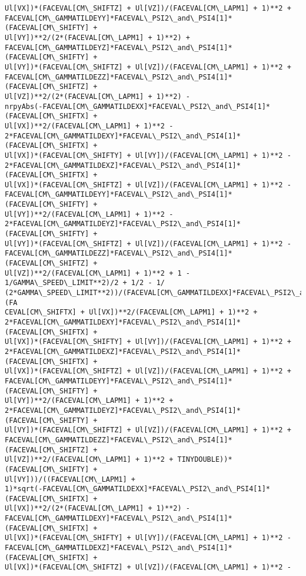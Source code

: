 \documentclass[landscape,letterpaper,10pt,english]{article}
\begin{document}
\begin{Verbatim}[commandchars=\\\{\}]
Ul[VX])*(FACEVAL[CM\_SHIFTZ] + Ul[VZ])/(FACEVAL[CM\_LAPM1] + 1)**2 +
FACEVAL[CM\_GAMMATILDEYY]*FACEVAL\_PSI2\_and\_PSI4[1]*(FACEVAL[CM\_SHIFTY] +
Ul[VY])**2/(2*(FACEVAL[CM\_LAPM1] + 1)**2) +
FACEVAL[CM\_GAMMATILDEYZ]*FACEVAL\_PSI2\_and\_PSI4[1]*(FACEVAL[CM\_SHIFTY] +
Ul[VY])*(FACEVAL[CM\_SHIFTZ] + Ul[VZ])/(FACEVAL[CM\_LAPM1] + 1)**2 +
FACEVAL[CM\_GAMMATILDEZZ]*FACEVAL\_PSI2\_and\_PSI4[1]*(FACEVAL[CM\_SHIFTZ] +
Ul[VZ])**2/(2*(FACEVAL[CM\_LAPM1] + 1)**2) -
nrpyAbs(-FACEVAL[CM\_GAMMATILDEXX]*FACEVAL\_PSI2\_and\_PSI4[1]*(FACEVAL[CM\_SHIFTX] +
Ul[VX])**2/(FACEVAL[CM\_LAPM1] + 1)**2 -
2*FACEVAL[CM\_GAMMATILDEXY]*FACEVAL\_PSI2\_and\_PSI4[1]*(FACEVAL[CM\_SHIFTX] +
Ul[VX])*(FACEVAL[CM\_SHIFTY] + Ul[VY])/(FACEVAL[CM\_LAPM1] + 1)**2 -
2*FACEVAL[CM\_GAMMATILDEXZ]*FACEVAL\_PSI2\_and\_PSI4[1]*(FACEVAL[CM\_SHIFTX] +
Ul[VX])*(FACEVAL[CM\_SHIFTZ] + Ul[VZ])/(FACEVAL[CM\_LAPM1] + 1)**2 -
FACEVAL[CM\_GAMMATILDEYY]*FACEVAL\_PSI2\_and\_PSI4[1]*(FACEVAL[CM\_SHIFTY] +
Ul[VY])**2/(FACEVAL[CM\_LAPM1] + 1)**2 -
2*FACEVAL[CM\_GAMMATILDEYZ]*FACEVAL\_PSI2\_and\_PSI4[1]*(FACEVAL[CM\_SHIFTY] +
Ul[VY])*(FACEVAL[CM\_SHIFTZ] + Ul[VZ])/(FACEVAL[CM\_LAPM1] + 1)**2 -
FACEVAL[CM\_GAMMATILDEZZ]*FACEVAL\_PSI2\_and\_PSI4[1]*(FACEVAL[CM\_SHIFTZ] +
Ul[VZ])**2/(FACEVAL[CM\_LAPM1] + 1)**2 + 1 - 1/GAMMA\_SPEED\_LIMIT**2)/2 + 1/2 - 1/
(2*GAMMA\_SPEED\_LIMIT**2))/(FACEVAL[CM\_GAMMATILDEXX]*FACEVAL\_PSI2\_and\_PSI4[1]*(FA
CEVAL[CM\_SHIFTX] + Ul[VX])**2/(FACEVAL[CM\_LAPM1] + 1)**2 +
2*FACEVAL[CM\_GAMMATILDEXY]*FACEVAL\_PSI2\_and\_PSI4[1]*(FACEVAL[CM\_SHIFTX] +
Ul[VX])*(FACEVAL[CM\_SHIFTY] + Ul[VY])/(FACEVAL[CM\_LAPM1] + 1)**2 +
2*FACEVAL[CM\_GAMMATILDEXZ]*FACEVAL\_PSI2\_and\_PSI4[1]*(FACEVAL[CM\_SHIFTX] +
Ul[VX])*(FACEVAL[CM\_SHIFTZ] + Ul[VZ])/(FACEVAL[CM\_LAPM1] + 1)**2 +
FACEVAL[CM\_GAMMATILDEYY]*FACEVAL\_PSI2\_and\_PSI4[1]*(FACEVAL[CM\_SHIFTY] +
Ul[VY])**2/(FACEVAL[CM\_LAPM1] + 1)**2 +
2*FACEVAL[CM\_GAMMATILDEYZ]*FACEVAL\_PSI2\_and\_PSI4[1]*(FACEVAL[CM\_SHIFTY] +
Ul[VY])*(FACEVAL[CM\_SHIFTZ] + Ul[VZ])/(FACEVAL[CM\_LAPM1] + 1)**2 +
FACEVAL[CM\_GAMMATILDEZZ]*FACEVAL\_PSI2\_and\_PSI4[1]*(FACEVAL[CM\_SHIFTZ] +
Ul[VZ])**2/(FACEVAL[CM\_LAPM1] + 1)**2 + TINYDOUBLE))*(FACEVAL[CM\_SHIFTY] +
Ul[VY]))/((FACEVAL[CM\_LAPM1] +
1)*sqrt(-FACEVAL[CM\_GAMMATILDEXX]*FACEVAL\_PSI2\_and\_PSI4[1]*(FACEVAL[CM\_SHIFTX] +
Ul[VX])**2/(2*(FACEVAL[CM\_LAPM1] + 1)**2) -
FACEVAL[CM\_GAMMATILDEXY]*FACEVAL\_PSI2\_and\_PSI4[1]*(FACEVAL[CM\_SHIFTX] +
Ul[VX])*(FACEVAL[CM\_SHIFTY] + Ul[VY])/(FACEVAL[CM\_LAPM1] + 1)**2 -
FACEVAL[CM\_GAMMATILDEXZ]*FACEVAL\_PSI2\_and\_PSI4[1]*(FACEVAL[CM\_SHIFTX] +
Ul[VX])*(FACEVAL[CM\_SHIFTZ] + Ul[VZ])/(FACEVAL[CM\_LAPM1] + 1)**2 -

\end{Verbatim}
\end{document}

